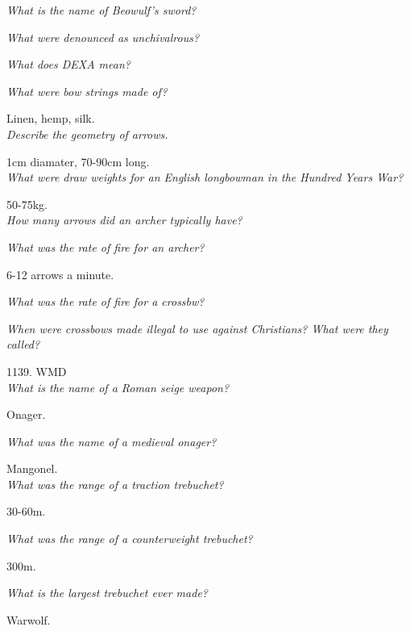 \documentclass[12pt]{article}
\begin{document}
\textit{What is the name of Beowulf's sword?}

\textit{What were denounced as unchivalrous?}

\textit{What does DEXA mean?}

\textit{What were bow strings made of?}

Linen, hemp, silk.\\

\textit{Describe the geometry of arrows.}

1cm diamater, 70-90cm long.\\

\textit{What were draw weights for an English longbowman in the Hundred Years War?}

50-75kg.\\

\textit{How many arrows did an archer typically have?}

\textit{What was the rate of fire for an archer?}

6-12 arrows a minute.

\textit{What was the rate of fire for a crossbw?}

\textit{When were crossbows made illegal to use against Christians? What were they called?}

1139. WMD\\

\textit{What is the name of a Roman seige weapon?}

Onager.

\textit{What was the name of a medieval onager?}

Mangonel.\\

\textit{What was the range of a traction trebuchet?}

30-60m.

\textit{What was the range of a counterweight trebuchet?}

300m.

\textit{What is the largest trebuchet ever made?}

Warwolf.\\
\end{document}
